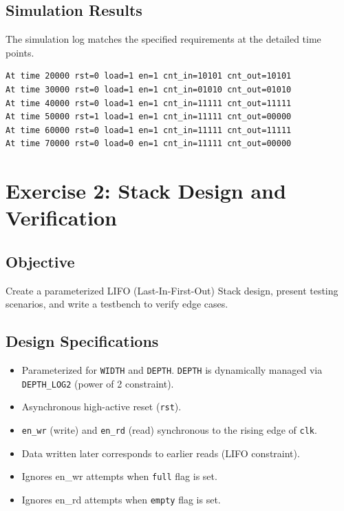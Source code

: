 \documentclass[12pt,a4paper]{article}
\begin{document}
\subsection{Simulation Results}
The simulation log matches the specified requirements at the detailed time points.
\begin{lstlisting}[language=bash]
At time 20000 rst=0 load=1 en=1 cnt_in=10101 cnt_out=10101
At time 30000 rst=0 load=1 en=1 cnt_in=01010 cnt_out=01010
At time 40000 rst=0 load=1 en=1 cnt_in=11111 cnt_out=11111
At time 50000 rst=1 load=1 en=1 cnt_in=11111 cnt_out=00000
At time 60000 rst=0 load=1 en=1 cnt_in=11111 cnt_out=11111
At time 70000 rst=0 load=0 en=1 cnt_in=11111 cnt_out=00000
\end{lstlisting}

\section{Exercise 2: Stack Design and Verification}

\subsection{Objective}
Create a parameterized LIFO (Last-In-First-Out) Stack design, present testing scenarios, and write a testbench to verify edge cases.

\subsection{Design Specifications}
\begin{itemize}
    \item Parameterized for \texttt{WIDTH} and \texttt{DEPTH}. \texttt{DEPTH} is dynamically managed via \texttt{DEPTH\_LOG2} (power of 2 constraint).
    \item Asynchronous high-active reset (\texttt{rst}).
    \item \texttt{en\_wr} (write) and \texttt{en\_rd} (read) synchronous to the rising edge of \texttt{clk}.
    \item Data written later corresponds to earlier reads (LIFO constraint).
    \item Ignores en\_wr attempts when \texttt{full} flag is set.
    \item Ignores en\_rd attempts when \texttt{empty} flag is set.
\end{itemize}
\end{document}

